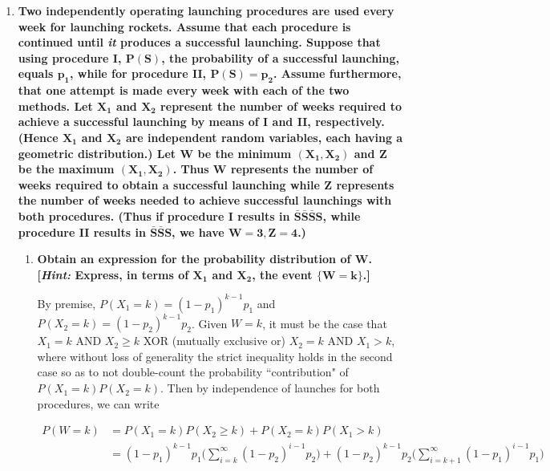 \documentclass[10pt, oneside]{article}   	%
\theoremstyle{definition}
\begin{document}
\begin{enumerate}[label=8.\arabic*]
\item  \begin{tcolorbox}[
  colback=Cerulean!5!white,
  colframe=Cerulean!75!black]
\textbf{Two independently operating launching procedures are used every week for launching rockets. Assume that each procedure is continued until \textit{it} produces a successful launching. Suppose that using procedure I, $\bm{P(S)}$, the probability of a successful launching, equals $\bm{p_1}$, while for procedure II, $\bm{P(S) = p_2}$. Assume furthermore, that one attempt is made every week with each of the two methods. Let $\bm{X_1}$ and $\bm{X_2}$ represent the number of weeks required to achieve a successful launching by means of I and II, respectively. (Hence $\bm{X_1}$ and $\bm{X_2}$ are independent random variables, each having a geometric distribution.) Let $\bm{W}$ be the minimum $\bm{(X_1, X_2)}$ and $\bm{Z}$ be the maximum $\bm{(X_1, X_2)}$. Thus $\bm{W}$ represents the number of weeks required to obtain $\bm{a}$ successful launching while $\bm{Z}$ represents the number of weeks needed to achieve successful launchings with both procedures. (Thus if procedure I results in $\bm{\bar{S} \bar{S} \bar{S} S}$, while procedure II results in $\bm{\bar{S} \bar{S} S}$, we have $\bm{W = 3, Z = 4}$.)}
\end{tcolorbox}

	\begin{enumerate}
	\item  \begin{tcolorbox}[
	  colback=Cerulean!5!white,
	  colframe=Cerulean!75!black]
	\textbf{Obtain an expression for the probability distribution of $\bm{W}$. [\textit{Hint:} Express, in terms of $\bm{X_1}$ and $\bm{X_2}$, the event $\bm{ \{ W = k \} }$.]}
	\end{tcolorbox}
	
	By premise, $P(X_1 = k) = (1 - p_1)^{k-1} p_1$ and $P(X_2 = k) = (1 - p_2)^{k-1} p_2$. Given $W = k$, it must be the case that $X_1 = k$ AND $X_2 \geq k$ XOR (mutually exclusive or) $X_2 = k$ AND $X_1 > k$, where without loss of generality the strict inequality holds in the second case so as to not double-count the probability ``contribution" of $P(X_1 = k) P(X_2 = k)$. Then by independence of launches for both procedures, we can write
	
	\begin{align*}
	P(W = k) &= P(X_1 = k) P(X_2 \geq k) + P(X_2 = k) P(X_1 > k) \\
	&= \boxed{ (1-p_1)^{k-1} p_1 \Bigg( \sum^{\infty}_{i=k} (1-p_2)^{i-1} p_2 \Bigg) + (1-p_2)^{k-1} p_2 \Bigg( \sum^{\infty}_{i = k+1} (1-p_1)^{i-1} p_1 \Bigg) }
	\end{align*}
	

\end{enumerate}
\end{enumerate}
\end{document}
